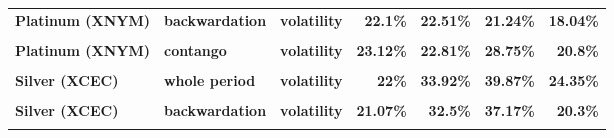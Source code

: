 \documentclass[
  authoryear,
  preprint,
  3p]{elsarticle}
\begin{document}
\begin{longtable}[t]{>{}l>{}l>{}l>{}r>{}r>{}r>{}r}
\addlinespace
\textbf{Platinum (XNYM)} & \textbf{backwardation} & \textbf{volatility} & \textcolor[HTML]{4285f4}{\textbf{22.1\%}} & \textcolor[HTML]{4285f4}{\textbf{22.51\%}} & \textcolor[HTML]{4285f4}{\textbf{21.24\%}} & \textcolor[HTML]{4285f4}{\textbf{18.04\%}}\\
\textbf{\cellcolor{gray!10}{Platinum (XNYM)}} & \textbf{\cellcolor{gray!10}{contango}} & \textbf{\cellcolor{gray!10}{mean}} & \textcolor[HTML]{4285f4}{\textbf{\cellcolor{gray!10}{-3.22\%}}} & \textcolor[HTML]{4285f4}{\textbf{\cellcolor{gray!10}{-3.81\%}}} & \textcolor[HTML]{4285f4}{\textbf{\cellcolor{gray!10}{8.04\%}}} & \textcolor[HTML]{4285f4}{\textbf{\cellcolor{gray!10}{-17.28\%}}}\\
\textbf{Platinum (XNYM)} & \textbf{contango} & \textbf{volatility} & \textcolor[HTML]{4285f4}{\textbf{23.12\%}} & \textcolor[HTML]{4285f4}{\textbf{22.81\%}} & \textcolor[HTML]{4285f4}{\textbf{28.75\%}} & \textcolor[HTML]{4285f4}{\textbf{20.8\%}}\\
\textbf{\cellcolor{gray!10}{Silver (XCEC)}} & \textbf{\cellcolor{gray!10}{whole period}} & \textbf{\cellcolor{gray!10}{mean}} & \textcolor[HTML]{4285f4}{\textbf{\cellcolor{gray!10}{6.19\%}}} & \textcolor[HTML]{4285f4}{\textbf{\cellcolor{gray!10}{17.54\%}}} & \textcolor[HTML]{4285f4}{\textbf{\cellcolor{gray!10}{21.96\%}}} & \textcolor[HTML]{4285f4}{\textbf{\cellcolor{gray!10}{-2.43\%}}}\\
\textbf{Silver (XCEC)} & \textbf{whole period} & \textbf{volatility} & \textcolor[HTML]{4285f4}{\textbf{22\%}} & \textcolor[HTML]{4285f4}{\textbf{33.92\%}} & \textcolor[HTML]{4285f4}{\textbf{39.87\%}} & \textcolor[HTML]{4285f4}{\textbf{24.35\%}}\\
\addlinespace
\textbf{\cellcolor{gray!10}{Silver (XCEC)}} & \textbf{\cellcolor{gray!10}{backwardation}} & \textbf{\cellcolor{gray!10}{mean}} & \textcolor[HTML]{4285f4}{\textbf{\cellcolor{gray!10}{5.98\%}}} & \textcolor[HTML]{4285f4}{\textbf{\cellcolor{gray!10}{14.29\%}}} & \textcolor[HTML]{4285f4}{\textbf{\cellcolor{gray!10}{19.66\%}}} & \textcolor[HTML]{4285f4}{\textbf{\cellcolor{gray!10}{3.44\%}}}\\
\textbf{Silver (XCEC)} & \textbf{backwardation} & \textbf{volatility} & \textcolor[HTML]{4285f4}{\textbf{21.07\%}} & \textcolor[HTML]{4285f4}{\textbf{32.5\%}} & \textcolor[HTML]{4285f4}{\textbf{37.17\%}} & \textcolor[HTML]{4285f4}{\textbf{20.3\%}}\\
\textbf{\cellcolor{gray!10}{Silver (XCEC)}} & \textbf{\cellcolor{gray!10}{contango}} & \textbf{\cellcolor{gray!10}{mean}} & \textcolor[HTML]{4285f4}{\textbf{\cellcolor{gray!10}{6.57\%}}} & \textcolor[HTML]{4285f4}{\textbf{\cellcolor{gray!10}{20.83\%}}} & \textcolor[HTML]{4285f4}{\textbf{\cellcolor{gray!10}{26.77\%}}} & \textcolor[HTML]{4285f4}{\textbf{\cellcolor{gray!10}{-8.09\%}}}\\

\end{longtable}
\end{document}
